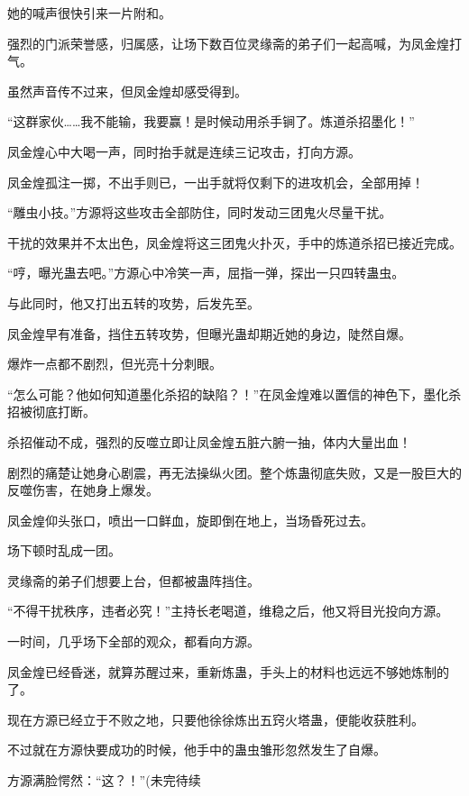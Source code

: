 \begin{this_body}
她的喊声很快引来一片附和。

强烈的门派荣誉感，归属感，让场下数百位灵缘斋的弟子们一起高喊，为凤金煌打气。

虽然声音传不过来，但凤金煌却感受得到。

“这群家伙……我不能输，我要赢！是时候动用杀手锏了。炼道杀招墨化！”

凤金煌心中大喝一声，同时抬手就是连续三记攻击，打向方源。

凤金煌孤注一掷，不出手则已，一出手就将仅剩下的进攻机会，全部用掉！

“雕虫小技。”方源将这些攻击全部防住，同时发动三团鬼火尽量干扰。

干扰的效果并不太出色，凤金煌将这三团鬼火扑灭，手中的炼道杀招已接近完成。

“哼，曝光蛊去吧。”方源心中冷笑一声，屈指一弹，探出一只四转蛊虫。

与此同时，他又打出五转的攻势，后发先至。

凤金煌早有准备，挡住五转攻势，但曝光蛊却期近她的身边，陡然自爆。

爆炸一点都不剧烈，但光亮十分刺眼。

“怎么可能？他如何知道墨化杀招的缺陷？！”在凤金煌难以置信的神色下，墨化杀招被彻底打断。

杀招催动不成，强烈的反噬立即让凤金煌五脏六腑一抽，体内大量出血！

剧烈的痛楚让她身心剧震，再无法操纵火团。整个炼蛊彻底失败，又是一股巨大的反噬伤害，在她身上爆发。

凤金煌仰头张口，喷出一口鲜血，旋即倒在地上，当场昏死过去。

场下顿时乱成一团。

灵缘斋的弟子们想要上台，但都被蛊阵挡住。

“不得干扰秩序，违者必究！”主持长老喝道，维稳之后，他又将目光投向方源。

一时间，几乎场下全部的观众，都看向方源。

凤金煌已经昏迷，就算苏醒过来，重新炼蛊，手头上的材料也远远不够她炼制的了。

现在方源已经立于不败之地，只要他徐徐炼出五窍火塔蛊，便能收获胜利。

不过就在方源快要成功的时候，他手中的蛊虫雏形忽然发生了自爆。

方源满脸愕然：“这？！”(未完待续

\end{this_body}

